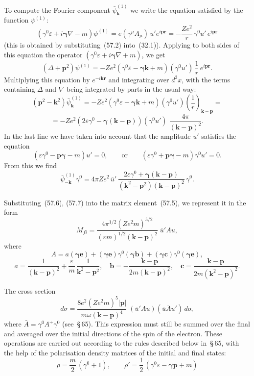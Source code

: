 To compute the Fourier component $\bar{\psi}^{(1)}_\mathbf{k}$ we write the equation satisfied by the function $\psi^{(1)}$:
\[
(\gamma^0\varepsilon + i\boldsymbol{\gamma}\nabla - m)\psi^{(1)} = e(\gamma^\mu A_\mu)\,u'e^{i\mathbf{p}\mathbf{r}} = -\frac{Ze^2}{r}\,\gamma^0 u'\,e^{i\mathbf{p}\mathbf{r}}
\]
(this is obtained by substituting~(57.2) into~(32.1)). Applying to both sides of this equation the operator $(\gamma^0\varepsilon + i\boldsymbol{\gamma}\nabla + m)$, we get
\[
(\Delta + \mathbf{p}^2)\psi^{(1)} = -Ze^2(\gamma^0\varepsilon - \boldsymbol{\gamma}\mathbf{k} + m)(\gamma^0 u')\,\frac{1}{r}\,e^{i\mathbf{p}\mathbf{r}}.
\]
Multiplying this equation by $e^{-i\mathbf{k}\mathbf{r}}$ and integrating over $d^3x$, with the terms containing $\Delta$ and $\nabla$ being integrated by parts in the usual way:
\[
(\mathbf{p}^2 - \mathbf{k}^2)\bar{\psi}^{(1)}_\mathbf{k} = -Ze^2(\gamma^0\varepsilon - \boldsymbol{\gamma}\mathbf{k} + m)(\gamma^0 u')\left(\frac{1}{r}\right)_{\mathbf{k}-\mathbf{p}} =
\]
\[
= -Ze^2(2\varepsilon\gamma^0 - \boldsymbol{\gamma}(\mathbf{k}-\mathbf{p}))(\gamma^0 u')\;\frac{4\pi}{(\mathbf{k}-\mathbf{p})^2}.
\]
In the last line we have taken into account that the amplitude $u'$ satisfies the equation
\[
(\varepsilon\gamma^0 - \mathbf{p}\boldsymbol{\gamma} - m)u' = 0,\qquad\text{or}\qquad (\varepsilon\gamma^0 + \mathbf{p}\boldsymbol{\gamma} - m)\gamma^0 u' = 0.
\]
From this we find
\begin{equation}
\bar{\psi}^{(1)}_{-\mathbf{k}}\gamma^0 = 4\pi Ze^2\,\bar{u}'\,\frac{2\varepsilon\gamma^0 + \boldsymbol{\gamma}(\mathbf{k}-\mathbf{p})}{(\mathbf{k}^2 - \mathbf{p}^2)(\mathbf{k}-\mathbf{p})^2}\,\gamma^0.
\tag{57.7}
\end{equation}

Substituting~(57.6), (57.7) into the matrix element~(57.5), we represent it in the form
\[
M_{fi} = \frac{4\pi^{1/2}(Ze^2m)^{5/2}}{(\varepsilon m)^{1/2}(\mathbf{k}-\mathbf{p})^2}\;\bar{u}'Au,
\]
where
\[
A = a(\boldsymbol{\gamma}\mathbf{e}) + (\boldsymbol{\gamma}\mathbf{e})\gamma^0(\boldsymbol{\gamma}\mathbf{b}) + (\boldsymbol{\gamma}\mathbf{c})\gamma^0(\boldsymbol{\gamma}\mathbf{e}),
\]
\[
a = \frac{1}{(\mathbf{k}-\mathbf{p})^2} + \frac{\varepsilon}{m}\,\frac{1}{\mathbf{k}^2 - \mathbf{p}^2},\quad \mathbf{b} = -\frac{\mathbf{k}-\mathbf{p}}{2m(\mathbf{k}-\mathbf{p})^2},\quad \mathbf{c} = \frac{\mathbf{k}-\mathbf{p}}{2m(\mathbf{k}^2 - \mathbf{p})^2}.
\]

The cross section
\[
d\sigma = \frac{8e^2(Ze^2m)^5|\mathbf{p}|}{m\omega(\mathbf{k}-\mathbf{p})^4}\;(\bar{u}'Au)(\bar{u}\bar{A}u')\,do,
\]
where $\bar{A} = \gamma^0 A^+\gamma^0$ (see~\S\,65). This expression must still be summed over the final and averaged over the initial directions of the spin of the electron. These operations are carried out according to the rules described below in~\S\,65, with the help of the polarisation density matrices of the initial and final states:
\[
\rho = \frac{m}{2}\,(\gamma^0 + 1),\qquad \rho' = \frac{1}{2}\,(\gamma^0\varepsilon - \boldsymbol{\gamma}\mathbf{p} + m)
\]

